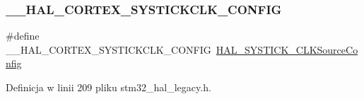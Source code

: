\subsubsection{\texorpdfstring{\+\_\+\+\_\+\+H\+A\+L\+\_\+\+C\+O\+R\+T\+E\+X\+\_\+\+S\+Y\+S\+T\+I\+C\+K\+C\+L\+K\+\_\+\+C\+O\+N\+F\+IG}{\_\_HAL\_CORTEX\_SYSTICKCLK\_CONFIG}}
{\footnotesize\ttfamily \#define \+\_\+\+\_\+\+H\+A\+L\+\_\+\+C\+O\+R\+T\+E\+X\+\_\+\+S\+Y\+S\+T\+I\+C\+K\+C\+L\+K\+\_\+\+C\+O\+N\+F\+IG~\hyperlink{group___c_o_r_t_e_x___exported___functions___group2_ga3284dc8428996f5b6aa6b3b99e643788}{H\+A\+L\+\_\+\+S\+Y\+S\+T\+I\+C\+K\+\_\+\+C\+L\+K\+Source\+Config}}



Definicja w linii 209 pliku stm32\+\_\+hal\+\_\+legacy.\+h.

